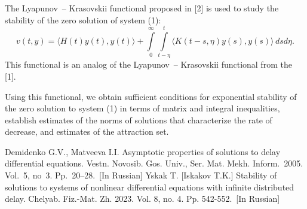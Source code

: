\documentclass[12pt]{llncs}
\begin{document}
The Lyapunov~-- Krasovskii functional proposed in [2] is used to study the stability of the zero solution of system (1): 
$$
v(t,y) = \langle H(t)y(t),
y(t)\rangle
 +\int\limits^\infty_0 \int\limits^t_{t-\eta}
 \langle K(t-s,\eta)y(s), y(s) \rangle \, dsd\eta.
$$
This functional is an analog of the Lyapunov~-- Krasovskii functional from the [1].

Using this functional, we obtain sufficient conditions for exponential stability of the 
zero solution to system (1) in terms of matrix and integral inequalities, establish estimates of the norms 
of solutions that characterize the rate of decrease, and estimates of the attraction set.  


%


\begin{thebibliography}{9} %
 Demidenko G.V., Matveeva I.I. Asymptotic properties of solutions to delay differential equations.
 Vestn. Novosib. Gos. Univ., Ser. Mat. Mekh. Inform.~2005. Vol.~5, no~3. Pp.~20--28.~[In Russian]
 Yskak T. [Iskakov T.K.] Stability of solutions to systems of nonlinear differential equations with infinite distributed delay.
 Chelyab. Fiz.-Mat. Zh. 2023. Vol. 8, no. 4. Pp. 542-552.~[In Russian]
\end{thebibliography}

\end{document}
